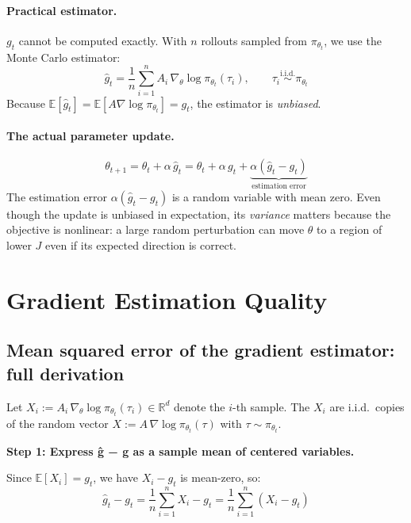 \documentclass[11pt,a4paper]{article}
\newcommand{\E}{\mathbb{E}}
\newcommand{\ghat}{\hat{g}_t}
\newcommand{\gtrue}{g_t}
\newcommand{\pith}{\pi_{\theta_t}}
\begin{document}
\paragraph{Practical estimator.}
$\gtrue$ cannot be computed exactly.
With $n$ rollouts sampled from $\pith$, we use the Monte Carlo estimator:
\begin{equation}
  \ghat = \frac{1}{n}\sum_{i=1}^{n} A_i\,\nabla_\theta \log \pith(\tau_i),
  \qquad \tau_i \overset{\mathrm{i.i.d.}}{\sim} \pith
  \label{eq:estimator}
\end{equation}
Because $\E[\ghat] = \E[A\nabla\log\pith] = \gtrue$, the estimator is \emph{unbiased}.

\paragraph{The actual parameter update.}
\begin{equation}
  \theta_{t+1} = \theta_t + \alpha\,\ghat
               = \theta_t + \alpha\,\gtrue + \underbrace{\alpha(\ghat - \gtrue)}_{\text{estimation error}}
  \label{eq:update}
\end{equation}
The estimation error $\alpha(\ghat - \gtrue)$ is a random variable with mean zero.
Even though the update is unbiased in expectation, its \emph{variance} matters because
the objective is nonlinear: a large random perturbation can move $\theta$ to a region of
lower $J$ even if its expected direction is correct.

\section{Gradient Estimation Quality}

\subsection{Mean squared error of the gradient estimator: full derivation}
\label{sec:mse}

Let $X_i := A_i\,\nabla_\theta \log \pith(\tau_i) \in \mathbb{R}^d$ denote the $i$-th sample.
The $X_i$ are i.i.d.\ copies of the random vector $X := A\,\nabla\log\pith(\tau)$ with $\tau\sim\pith$.

\textbf{Step 1: Express ĝ − g as a sample mean of centered variables.}

Since $\E[X_i] = \gtrue$, we have $X_i - \gtrue$ is mean-zero, so:
\begin{equation}
  \ghat - \gtrue
  = \frac{1}{n}\sum_{i=1}^{n} X_i - \gtrue
  = \frac{1}{n}\sum_{i=1}^{n} (X_i - \gtrue)
  \label{eq:centered}
\end{equation}
\end{document}
